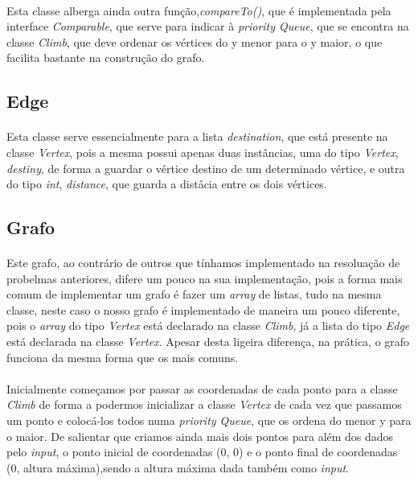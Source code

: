 \documentclass[12pt]{article}
\begin{document}
\paragraph{}
Esta classe alberga ainda outra função,\textit{compareTo()}, que é implementada pela interface \textit{Comparable}, que serve para indicar à \textit{priority Queue}, que se encontra na classe \textit{Climb}, que deve ordenar os vértices do y menor para o y maior, o que facilita bastante na construção do grafo.
\subsection{Edge}
\paragraph{}
Esta classe serve essencialmente para a lista \textit{destination}, que está presente na classe \textit{Vertex}, pois a mesma possui apenas duas instâncias, uma do tipo \textit{Vertex}, \textit{destiny}, de forma a guardar o vértice destino de um determinado vértice, e outra do tipo \textit{int}, \textit{distance}, que guarda a distâcia entre os dois vértices.
\newpage
\begin{center}
\section{Grafo}
\end{center}
\paragraph{}
Este grafo, ao contrário de outros que tínhamos implementado na resoluação de probelmas anteriores, difere um pouco na sua implementação, pois a forma mais comum de implementar um grafo é fazer um \textit{array} de listas, tudo na mesma classe, neste caso o nosso grafo é implementado de maneira um pouco diferente, pois o \textit{array} do tipo \textit{Vertex} está declarado na classe \textit{Climb}, já a lista do tipo \textit{Edge} está declarada na classe \textit{Vertex}. Apesar desta ligeira diferença, na prática, o grafo funciona da mesma forma que os mais comuns.
\paragraph{}
Inicialmente começamos por passar as coordenadas de cada ponto para a classe \textit{Climb} de forma a podermos inicializar a classe \textit{Vertex} de cada vez que passamos um ponto e colocá-los todos numa \textit{priority Queue}, que os ordena do menor y para o maior. De salientar que criamos ainda mais dois pontos para além dos dados pelo \textit{input}, o ponto inicial de coordenadas (0, 0) e o ponto final de coordenadas (0, altura máxima),sendo a altura máxima dada também como \textit{input}.
\end{document}
